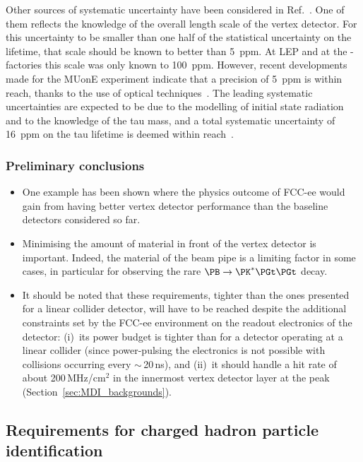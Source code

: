 Other sources of systematic uncertainty have been considered in Ref.~\cite{Lusiani:2024tau}. 
One of them reflects the knowledge of the overall length scale of the vertex detector. 
For this uncertainty to be smaller than one half of the statistical uncertainty on the \PGt lifetime, that scale should be known to better than 5~ppm. 
At LEP and at the \PB-factories this scale was only known to 100~ppm. 
However, recent developments made for the MUonE experiment indicate that a precision of 5~ppm is within reach, thanks to the use of optical techniques~\cite{9803636}. 
The leading systematic uncertainties are expected to be due to the modelling of initial state radiation and to the knowledge of the tau mass, and a total systematic uncertainty of 16~ppm on the tau lifetime is deemed within reach~\cite{Lusiani:2024tau}.

\subsubsection{Preliminary conclusions}

\begin{itemize}

\item One example has been shown where the physics outcome of FCC-ee would gain from having better vertex detector performance than the baseline detectors considered so far. 

\item Minimising the amount of material in front of the vertex detector is important. 
Indeed, the material of the beam pipe is a limiting factor in some cases, 
in particular for observing the rare $\PB \to \PK^{*} \PGt \PGt$ decay.

\item It should be noted that these requirements, tighter than the ones presented for a linear collider detector, 
will have to be reached despite the additional constraints set by the FCC-ee environment on the readout electronics of the detector: 
(i)~its power budget is tighter than for a detector operating at a linear collider 
(since power-pulsing the electronics is not possible with collisions occurring every $\sim$\,20\,ns), 
and (ii)~it should handle a hit rate of about 200\,MHz/cm$^2$ in the innermost vertex detector layer at the \PZ peak (Section~\ref{sec:MDI_backgrounds}).

\end{itemize}

\subsection{Requirements for charged hadron particle identification}
\label{sec:PhysPerf_PID}

